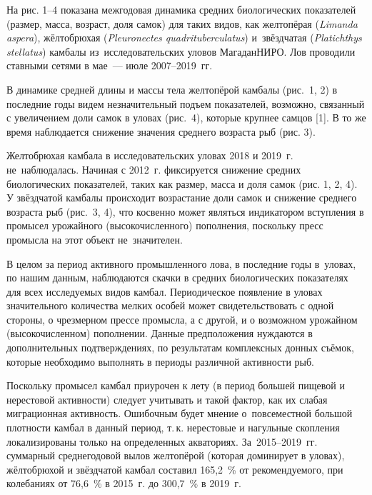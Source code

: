 На рис. 1--4 показана межгодовая динамика средних биологических показателей (размер, масса, возраст, доля самок) для таких видов, как желтопёрая (\textit{Limanda aspera}), жёлтобрюхая (\textit{Pleuronectes quadrituberculatus}) и~звёздчатая (\textit{Platichthys stellatus}) камбалы из~исследовательских уловов МагаданНИРО. Лов проводили ставными сетями в мае~--- июле 2007--2019~гг.
\clearpage





В динамике средней длины и массы тела желтопёрой камбалы (рис.~1, 2) в последние годы видем незначительный подъем показателей, возможно, связанный с увеличением доли самок в уловах (рис. 4), которые крупнее самцов [1]. В то же время наблюдается снижение значения среднего возраста рыб (рис. 3).

Желтобрюхая камбала в исследовательских уловах 2018 и 2019~г. не~наблюдалась. Начиная с 2012~г. фиксируется снижение средних биологических показателей, таких как размер, масса и доля самок (рис. 1, 2, 4).
\clearpage
У звёздчатой камбалы происходит возрастание доли самок и снижение среднего возраста рыб (рис. 3, 4), что косвенно может являться индикатором вступления в промысел урожайного (высокочисленного) пополнения, поскольку пресс промысла на этот объект не~значителен.

В целом за период активного промышленного лова, в последние годы в~уловах, по нашим данным, наблюдаются скачки в средних биологических показателях для всех исследуемых видов камбал. Периодическое появление в уловах значительного количества мелких особей может свидетельствовать с одной стороны, о чрезмерном прессе промысла, а с другой, и о возможном урожайном (высокочисленном) пополнении. Данные предположения нуждаются в дополнительных подтверждениях, по результатам комплексных донных съёмок, которые необходимо выполнять в периоды различной активности рыб.

Поскольку промысел камбал приурочен к лету (в период большей пищевой и нерестовой активности) следует учитывать и такой фактор, как их слабая миграционная активность. Ошибочным будет мнение о~повсеместной большой плотности камбал в данный период, т.\,к. нерестовые и нагульные скопления локализированы только на определенных акваториях. За~2015--2019~гг. суммарный среднегодовой вылов желтопёрой (которая доминирует в уловах), жёлтобрюхой и звёздчатой камбал составил 165,2~\% от рекомендуемого, при колебаниях от 76,6~\% в 2015~г. до 300,7~\% в 2019~г.


